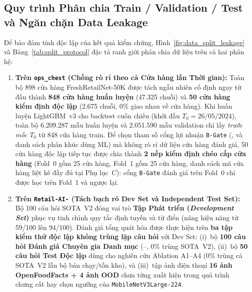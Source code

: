 \subsection*{Quy trình Phân chia Train / Validation / Test và Ngăn chặn Data Leakage}
Để bảo đảm tính độc lập của kết quả kiểm chứng, Hình~\ref{fig:data_split_leakage} và Bảng~\ref{tab:split_protocol} đặc tả ranh giới phân chia dữ liệu trên cả hai phân hệ:
\begin{enumerate}
    \item \textbf{Trên \texttt{ops\_chest} (Chống rò rỉ theo cả Cửa hàng lẫn Thời gian):} Toàn bộ 898 cửa hàng FreshRetailNet-50K được tách ngẫu nhiên cố định ngay từ đầu thành \textbf{848 cửa hàng huấn luyện} (47.325 chuỗi) và \textbf{50 cửa hàng kiểm định độc lập} (2.675 chuỗi, 0\% giao nhau về cửa hàng). Khi huấn luyện LightGBM~v3 cho backtest cuốn chiếu (khởi đầu $T_0 = \text{26/05/2024}$), toàn bộ 6.209.287 mẫu huấn luyện và 2.051.590 mẫu validation chỉ lấy \emph{trước mốc $T_0$} từ 848 cửa hàng train. Để chọn tham số cổng lợi nhuận \texttt{B-Gate} (,  và danh sách phân khúc dùng ML) mà không rò rỉ dữ liệu cửa hàng đánh giá, 50 cửa hàng độc lập tiếp tục được chia thành \textbf{2 nếp kiểm định chéo cấp cửa hàng} (Fold~0 gồm 25 cửa hàng, Fold~1 gồm 25 cửa hàng, danh sách mã cửa hàng liệt kê đầy đủ tại Phụ lục~C): cổng \texttt{B-Gate} đánh giá trên Fold~0 chỉ được học trên Fold~1 và ngược lại.
    \item \textbf{Trên \texttt{Retail-AI-} (Tách bạch rõ Dev Set và Independent Test Set):} Bộ 100 câu hỏi SOTA~V2 đóng vai trò \textbf{Tập Phát triển (\emph{Development Set})} phục vụ tinh chỉnh quy tắc định tuyến và từ điển (nâng hiệu năng từ 59/100 lên 94/100). Đánh giá tổng quát hóa được thực hiện trên \textbf{ba tập kiểm thử độc lập không trùng lặp câu hỏi} với Dev Set: (i)~bộ \textbf{100 câu hỏi Đánh giá Chuyên gia Danh mục} (--, 0\% trùng SOTA~V2), (ii)~bộ \textbf{50 câu hỏi Test Độc lập} dùng cho nghiên cứu Ablation A1--A4 (0\% trùng cả SOTA~V2 lẫn bộ bán chạy/tồn kho), và (iii)~tập ảnh điện thoại \textbf{16 ảnh OpenFoodFacts + 4 ảnh OOD} chưa từng xuất hiện trong quá trình chưng cất hay chọn ngưỡng của \texttt{MobileNetV3Large-224}.
\end{enumerate}

